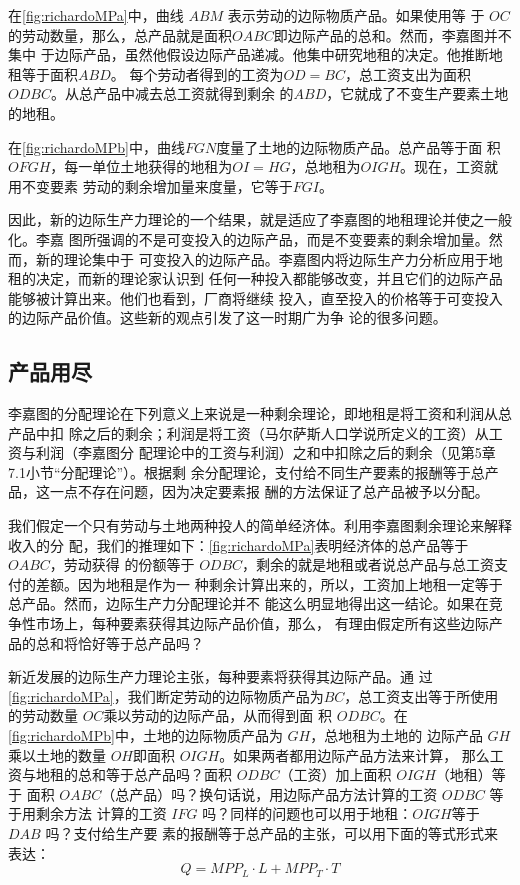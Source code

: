 在\cref{fig:richardoMPa}中，曲线 $ABM$ 表示劳动的边际物质产品。如果使用等
于 $OC$的劳动数量，那么，总产品就是面积$OABC$即边际产品的总和。然而，李嘉图并不集中
于边际产品，虽然他假设边际产品递减。他集中研究地租的决定。他推断地租等于面积$ABD$。
每个劳动者得到的工资为$OD=BC$，总工资支出为面积$ODBC$。从总产品中减去总工资就得到剩余
的$ABD$，它就成了不变生产要素土地的地租。

在\cref{fig:richardoMPb}中，曲线$FGN$度量了土地的边际物质产品。总产品等于面
积$OFGH$，每一单位土地获得的地租为$OI=HG$，总地租为$OIGH$。现在，工资就用不变要素
劳动的剩余增加量来度量，它等于$FGI$。

因此，新的边际生产力理论的一个结果，就是适应了李嘉图的地租理论并使之一般化。李嘉
图所强调的不是可变投入的边际产品，而是不变要素的剩余增加量。然而，新的理论集中于
可变投入的边际产品。李嘉图内将边际生产力分析应用于地租的决定，而新的理论家认识到
任何一种投入都能够改变，并且它们的边际产品能够被计算出来。他们也看到，厂商将继续
投入，直至投入的价格等于可变投入的边际产品价值。这些新的观点引发了这一时期广为争
论的很多问题。

\subsection{产品用尽}

李嘉图的分配理论在下列意义上来说是一种剩余理论，即地租是将工资和利润从总产品中扣
除之后的剩余；利润是将工资（马尔萨斯人口学说所定义的工资）从工资与利润（李嘉图分
配理论中的工资与利润）之和中扣除之后的剩余（见第5章7.1小节“分配理论”）。根据剩
余分配理论，支付给不同生产要素的报酬等于总产品，这一点不存在问题，因为决定要素报
酬的方法保证了总产品被予以分配。

我们假定一个只有劳动与土地两种投人的简单经济体。利用李嘉图剩余理论来解释收入的分
配，我们的推理如下：\cref{fig:richardoMPa}表明经济体的总产品等于 $OABC$，劳动获得
的份额等于 $ODBC$，剩余的就是地租或者说总产品与总工资支付的差额。因为地租是作为一
种剩余计算出来的，所以，工资加上地租一定等于总产品。然而，边际生产力分配理论并不
能这么明显地得出这一结论。如果在竞争性市场上，每种要素获得其边际产品价值，那么，
有理由假定所有这些边际产品的总和将恰好等于总产品吗？

新近发展的边际生产力理论主张，每种要素将获得其边际产品。通
过\cref{fig:richardoMPa}，我们断定劳动的边际物质产品为$BC$，总工资支出等于所使用
的劳动数量 $OC$乘以劳动的边际产品，从而得到面
积 $ODBC$。在\cref{fig:richardoMPb}中，土地的边际物质产品为 $GH$，总地租为土地的
边际产品 $GH$ 乘以土地的数量 $OH$即面积 $OIGH$。如果两者都用边际产品方法来计算，
那么工资与地租的总和等于总产品吗？面积 $ODBC$（工资）加上面积 $OIGH$（地租）等于
面积 $OABC$（总产品）吗？换句话说，用边际产品方法计算的工资 $ODBC$ 等于用剩余方法
计算的工资 $IFG$ 吗？同样的问题也可以用于地租：$OIGH$等于 $DAB$ 吗？支付给生产要
素的报酬等于总产品的主张，可以用下面的等式形式来表达：
\[Q=MPP_L·L + MPP_T · T\]


